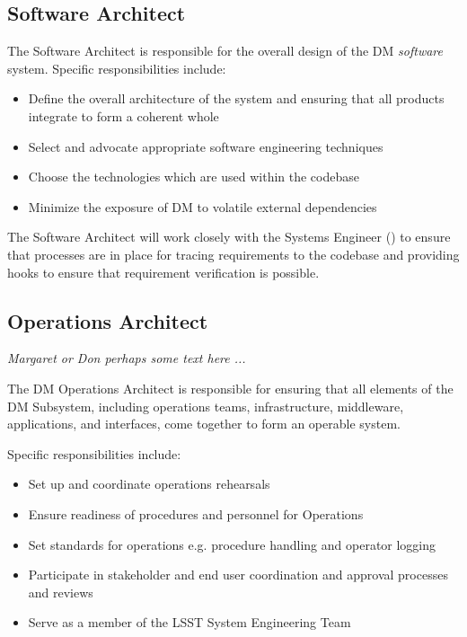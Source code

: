 \subsection{Software Architect \label{role:softarc}}

The Software Architect is responsible for the overall design of the DM \textit{software} system. Specific responsibilities include:

\begin{itemize}

\item{Define the overall architecture of the system and ensuring that all products integrate to form a coherent whole}
\item{Select and advocate appropriate software engineering techniques}
\item{Choose the technologies which are used within the codebase}
\item{Minimize the exposure of DM to volatile external dependencies}

\end{itemize}

The Software Architect will work closely with the Systems Engineer () to ensure that processes are in place for tracing requirements to the codebase and providing hooks to ensure that requirement verification is possible.

\subsection{Operations Architect \label{role:opsarc}}

\textit{Margaret or Don perhaps some text here ...}

The DM Operations Architect is responsible for ensuring that all elements of the DM Subsystem, including operations teams, infrastructure, middleware, applications, and interfaces,
come together to form an operable system.

Specific responsibilities include:

\begin{itemize}
\item Set up and coordinate  operations rehearsals
\item Ensure readiness of procedures and personnel for Operations
\item Set standards for operations e.g. procedure handling and operator logging
\item Participate in stakeholder and end user coordination and approval processes and reviews
\item Serve as a member of the LSST System Engineering Team
\end{itemize}

